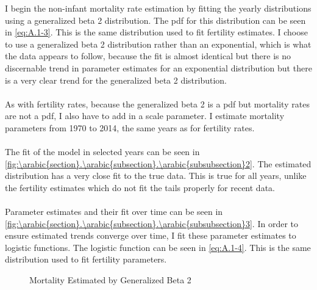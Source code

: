 \documentclass[10pt]{article}
\renewcommand{\thesection}{\arabic{section}}
\renewcommand{\thesubsection}{\thesection.\arabic{subsection}}
\renewcommand{\thesubsubsection}{\thesubsection.\arabic{subsubsection}}
\numberwithin{equation}{subsection}
\newcommand*{\FigureDir}{../../graphs}
\begin{document}
\begin{appendices}
\noindent
I begin the non-infant mortality rate estimation by fitting the yearly distributions using a generalized beta 2 distribution. The pdf for this distribution can be seen in \ref{eq:A.1-3}. This is the same distribution used to fit fertility estimates. I choose to use a generalized beta 2 distribution rather than an exponential, which is what the data appears to follow, because the fit is almost identical but there is no discernable trend in parameter estimates for an exponential distribution but there is a very clear trend for the generalized beta 2 distribution.
\\\\
As with fertility rates, because the generalized beta 2 is a pdf but mortality rates are not a pdf, I also have to add in a scale parameter. I estimate mortality parameters from 1970 to 2014, the same years as for fertility rates.
\\\\
The fit of the model in selected years can be seen in \autoref{fig:\thesubsubsection2}. The estimated distribution has a very close fit to the true data. This is true for all years, unlike the fertility estimates which do not fit the tails properly for recent data.
\\\\
Parameter estimates and their fit over time can be seen in \autoref{fig:\thesubsubsection3}. In order to ensure estimated trends converge over time, I fit these parameter estimates to logistic functions. The logistic function can be seen in \ref{eq:A.1-4}. This is the same distribution used to fit fertility parameters.

\begin{figure}[H]
   \centering
   \caption{\label{fig:\thesubsubsection2}Mortality Estimated by Generalized Beta 2}
\end{figure}


\end{appendices}
\end{document}
